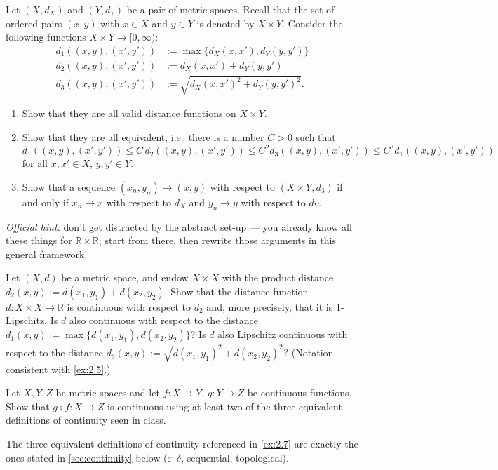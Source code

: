 \begin{exercise}
\label{ex:2.5}
Let $(X, d_X)$ and $(Y, d_Y)$ be a pair of metric spaces. Recall that the set of ordered pairs
$(x,y)$ with $x \in X$ and $y \in Y$ is denoted by $X \times Y$. Consider the following functions
$X \times Y \to [0,\infty)$:
$$
\begin{aligned}
d_1((x,y),(x',y')) &:= \max\{d_X(x,x'), d_Y(y,y')\} \\
d_2((x,y),(x',y')) &:= d_X(x,x') + d_Y(y,y') \\
d_3((x,y),(x',y')) &:= \sqrt{d_X(x,x')^2 + d_Y(y,y')^2}.
\end{aligned}
$$
\begin{enumerate}[label=\textbf{\arabic*.}]
  \item Show that they are all valid distance functions on $X \times Y$.
  \item Show that they are all equivalent, i.e.\ there is a number $C > 0$ such that
    $$d_1((x,y),(x',y')) \leq C\,d_2((x,y),(x',y')) \leq C^2 d_3((x,y),(x',y')) \leq C^3 d_1((x,y),(x',y'))$$
    for all $x, x' \in X$, $y, y' \in Y$.
  \item Show that a sequence $(x_n, y_n) \to (x,y)$ with respect to $(X \times Y, d_3)$ if and
    only if $x_n \to x$ with respect to $d_X$ and $y_n \to y$ with respect to $d_Y$.
\end{enumerate}
\textit{Official hint:} don't get distracted by the abstract set-up --- you already know all
these things for $\mathbb{R} \times \mathbb{R}$; start from there, then rewrite those arguments in
this general framework.
\end{exercise}

\begin{exercise}
\label{ex:2.6}
Let $(X,d)$ be a metric space, and endow $X \times X$ with the product distance
$d_2(x,y) := d(x_1,y_1) + d(x_2,y_2)$. Show that the distance function
$d : X \times X \to \mathbb{R}$ is continuous with respect to $d_2$ and, more precisely, that it
is 1-Lipschitz. Is $d$ also continuous with respect to the distance
$d_1(x,y) := \max\{d(x_1,y_1), d(x_2,y_2)\}$? Is $d$ also Lipschitz continuous with respect to the
distance $d_3(x,y) := \sqrt{d(x_1,y_1)^2 + d(x_2,y_2)^2}$? (Notation consistent with
\cref{ex:2.5}.)
\end{exercise}

\begin{exercise}
\label{ex:2.7}
Let $X, Y, Z$ be metric spaces and let $f : X \to Y$, $g : Y \to Z$ be continuous functions. Show
that $g \circ f : X \to Z$ is continuous using at least two of the three equivalent definitions of
continuity seen in class.
\end{exercise}

\begin{remark}
The three equivalent definitions of continuity referenced in \cref{ex:2.7} are exactly the ones
stated in \cref{sec:continuity} below (\(\varepsilon\)--\(\delta\), sequential, topological).
\end{remark}
